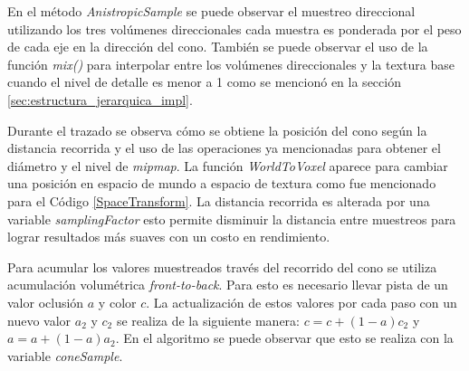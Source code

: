 En el método \emph{AnistropicSample} se puede observar el muestreo direccional utilizando los tres volúmenes direccionales cada muestra es ponderada por el peso de cada eje en la dirección del cono. También se puede observar el uso de la función \emph{mix()} para interpolar entre los volúmenes direccionales y la textura base cuando el nivel de detalle es menor a 1 como se mencionó en la sección \ref{sec:estructura_jerarquica_impl}.

Durante el trazado se observa cómo se obtiene la posición del cono según la distancia recorrida y el uso de las operaciones ya mencionadas para obtener el diámetro y el nivel de \emph{mipmap}. La función \emph{WorldToVoxel} aparece para cambiar una posición en espacio de mundo a espacio de textura como fue mencionado para el Código \ref{SpaceTransform}. La distancia recorrida es alterada por una variable \emph{samplingFactor} esto permite disminuir la distancia entre muestreos para lograr resultados más suaves con un costo en rendimiento.

Para acumular los valores muestreados través del recorrido del cono se utiliza acumulación volumétrica \emph{front-to-back}. Para esto es necesario llevar pista de un valor oclusión $a$ y color $c$. La actualización de estos valores por cada paso con un nuevo valor $a_2$ y $c_2$ se realiza de la siguiente manera: $c=c+(1-a)c_2$ y $a=a+(1-a)a_2$. En el algoritmo se puede observar que esto se realiza con la variable \emph{coneSample}.

